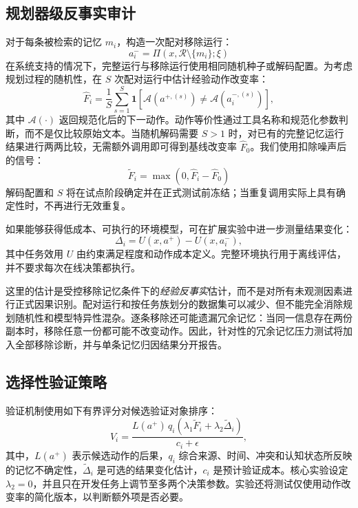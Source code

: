 \documentclass[11pt]{article}
\newcommand{\R}{\mathcal{R}}
\newcommand{\A}{\mathcal{A}}
\begin{document}
\subsection{规划器级反事实审计}

对于每条被检索的记忆 $m_i$，构造一次配对移除运行：
\begin{equation}
  a_i^{-}=\Pi\!\left(x,\R\setminus\{m_i\};\xi\right)
\end{equation}
在系统支持的情况下，完整运行与移除运行使用相同随机种子或解码配置。为考虑规划过程的随机性，在 $S$ 次配对运行中估计经验动作改变率：
\begin{equation}
  \widehat{F}_i=\frac{1}{S}\sum_{s=1}^{S}
  \mathbf{1}\!\left[\A\!\left(a^{+,(s)}\right)\neq
  \A\!\left(a_i^{-,(s)}\right)\right],
\end{equation}
其中 $\A(\cdot)$ 返回规范化后的下一动作。动作等价性通过工具名称和规范化参数判断，而不是仅比较原始文本。当随机解码需要 $S>1$ 时，对已有的完整记忆运行结果进行两两比较，无需额外调用即可得到基线改变率 $\widehat{F}_0$。我们使用扣除噪声后的信号：
\begin{equation}
  \widetilde{F}_i=\max\left(0,\widehat{F}_i-\widehat{F}_0\right)
\end{equation}
解码配置和 $S$ 将在试点阶段确定并在正式测试前冻结；当重复调用实际上具有确定性时，不再进行无效重复。

如果能够获得低成本、可执行的环境模型，可在扩展实验中进一步测量结果变化：
\begin{equation}
  \Delta_i=U(x,a^{+})-U(x,a_i^{-}),
\end{equation}
其中任务效用 $U$ 由约束满足程度和动作成本定义。完整环境执行用于离线评估，并不要求每次在线决策都执行。

这里的估计是受控移除记忆条件下的\emph{经验反事实}估计，而不是对所有未观测因素进行正式因果识别。配对运行和按任务族划分的数据集可以减少、但不能完全消除规划随机性和模型特异性混杂。逐条移除还可能遗漏冗余记忆：当同一信息存在两份副本时，移除任意一份都可能不改变动作。因此，针对性的冗余记忆压力测试将加入全部移除诊断，并与单条记忆归因结果分开报告。

\subsection{选择性验证策略}

验证机制使用如下有界评分对候选验证对象排序：
\begin{equation}
  V_i=\frac{L(a^{+})\,q_i\left(\lambda_1\widetilde{F}_i+
  \lambda_2\widetilde{\Delta}_i\right)}{c_i+\epsilon},
\end{equation}
其中，$L(a^{+})$ 表示候选动作的后果，$q_i$ 综合来源、时间、冲突和认知状态所反映的记忆不确定性，$\widetilde{\Delta}_i$ 是可选的结果变化估计，$c_i$ 是预计验证成本。核心实验设定 $\lambda_2=0$，并且只在开发任务上调节至多两个决策参数。实验还将测试仅使用动作改变率的简化版本，以判断额外项是否必要。
\end{document}
